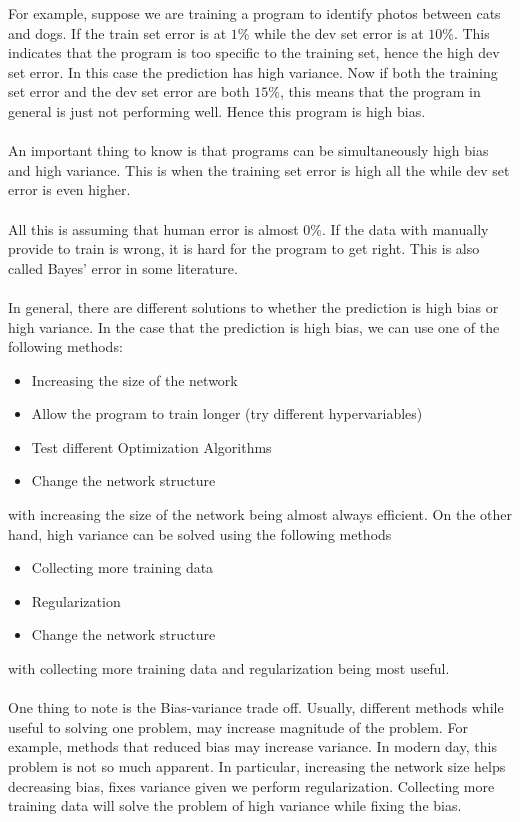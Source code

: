 \documentclass[a4paper]{article}
\begin{document}
\begin{enumerate}
For example, suppose we are training a program to identify photos between cats and dogs. If the train set error is at $1\%$ while the dev set error is at $10\%$. This indicates that the program is too specific to the training set, hence the high dev set error. In this case the prediction has high variance. Now if both the training set error and the dev set error are both $15\%$, this means that the program in general is just not performing well. Hence this program is high bias. \\~\\

An important thing to know is that programs can be simultaneously high bias and high variance. This is when the training set error is high all the while dev set error is even higher. \\~\\

All this is assuming that human error is almost $0\%$. If the data with manually provide to train is wrong, it is hard for the program to get right. This is also called Bayes' error in some literature. \\~\\
In general, there are different solutions to whether the prediction is high bias or high variance. In the case that the prediction is high bias, we can use one of the following methods: 
\begin{itemize}
\item Increasing the size of the network
\item Allow the program to train longer (try different hypervariables)
\item Test different Optimization Algorithms
\item Change the network structure
\end{itemize}
with increasing the size of the network being almost always efficient. On the other hand, high variance can be solved using the following methods 
\begin{itemize}
\item Collecting more training data
\item Regularization
\item Change the network structure
\end{itemize}
with collecting more training data and regularization being most useful. \\~\\
One thing to note is the Bias-variance trade off. Usually, different methods while useful to solving one problem, may increase magnitude of the problem. For example, methods that reduced bias may increase variance. In modern day, this problem is not so much apparent. In particular, increasing the network size helps decreasing bias, fixes variance given we perform regularization. Collecting more training data will solve the problem of high variance while fixing the bias. 


\end{enumerate}
\end{document}
